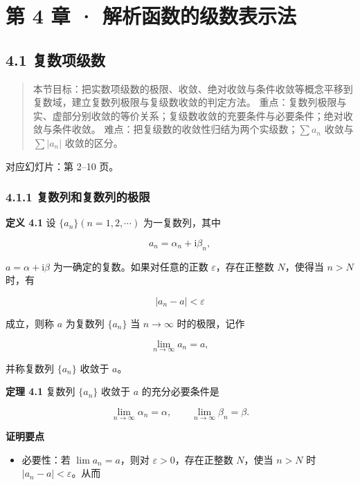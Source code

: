\chapter{第 4 章 ·
解析函数的级数表示法}\label{ux7b2c-4-ux7ae0-ux89e3ux6790ux51fdux6570ux7684ux7ea7ux6570ux8868ux793aux6cd5}

\section{4.1 复数项级数}\label{ux590dux6570ux9879ux7ea7ux6570}

\begin{quote}
本节目标：把实数项级数的极限、收敛、绝对收敛与条件收敛等概念平移到复数域，建立复数列极限与复级数收敛的判定方法。
重点：复数列极限与实、虚部分别收敛的等价关系；复级数收敛的充要条件与必要条件；绝对收敛与条件收敛。
难点：把复级数的收敛性归结为两个实级数；\(\sum a_n\) 收敛与
\(\sum |a_n|\) 收敛的区分。
\end{quote}

对应幻灯片：第 2--10 页。

\subsection{4.1.1
复数列和复数列的极限}\label{ux590dux6570ux5217ux548cux590dux6570ux5217ux7684ux6781ux9650}

\textbf{定义 4.1} 设 \(\{a_n\}(n=1,2,\cdots)\) 为一复数列，其中

\[
a_n=\alpha_n+\mathrm{i}\beta_n,
\]

\(a=\alpha+\mathrm{i}\beta\) 为一确定的复数。如果对任意的正数
\(\varepsilon\)，存在正整数 \(N\)，使得当 \(n>N\) 时，有

\[
|a_n-a|<\varepsilon
\]

成立，则称 \(a\) 为复数列 \(\{a_n\}\) 当 \(n\to\infty\) 时的极限，记作

\[
\lim_{n\to\infty} a_n=a,
\]

并称复数列 \(\{a_n\}\) 收敛于 \(a\)。

\textbf{定理 4.1} 复数列 \(\{a_n\}\) 收敛于 \(a\) 的充分必要条件是

\[
\lim_{n\to\infty}\alpha_n=\alpha,\qquad \lim_{n\to\infty}\beta_n=\beta .
\]

\textbf{证明要点}

\begin{itemize}
\tightlist
\item
  必要性：若 \(\lim a_n=a\)，则对 \(\varepsilon>0\)，存在正整数
  \(N\)，使当 \(n>N\) 时 \(|a_n-a|<\varepsilon\)。从而
\end{itemize}

